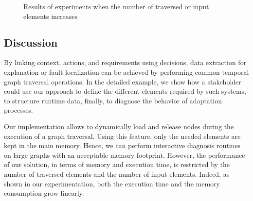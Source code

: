 \begin{figure}
	\centering
	\hfil
	\centering
\caption{Results of experiments when the number of traversed or input elements  increases}
\label{fig:exp-res}
\end{figure}

\subsection{Discussion}
By linking context, actions, and requirements using decisions, data extraction for explanation or fault localization can be achieved by performing common temporal graph traversal operations.
In the detailed example, we show how a stakeholder could use our approach to define the different elements required by such systems, to structure runtime data, finally, to diagnose the behavior of adaptation processes. 

Our implementation allows to dynamically load and release nodes during the execution of a graph traversal. Using this feature, only the needed elements are kept in the main memory.  Hence, we can perform interactive diagnosis routines on large graphs with an acceptable memory footprint. 
However, the performance of our solution, in terms of memory and execution time, is restricted by the number of traversed elements and the number of input elements.
Indeed, as shown in our experimentation, both the execution time and the memory consumption grow linearly.


